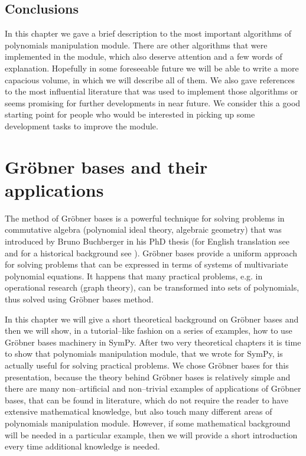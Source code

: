 \subsection{Conclusions}

In this chapter we gave a brief description to the most important algorithms of polynomials
manipulation module. There are other algorithms that were implemented in the module, which
also deserve attention and a few words of explanation. Hopefully in some foreseeable future
we will be able to write a more capacious volume, in which we will describe all of them. We
also gave references to the most influential literature that was used to implement those
algorithms or seems promising for further developments in near future. We consider this a
good starting point for people who would be interested in picking up some development tasks
to improve the module.

\hypertarget{--doc-src/groebner}{}

\section{Gröbner bases and their applications}\label{thesis-groebner}

The method of Gröbner bases is a powerful technique for solving problems in commutative
algebra (polynomial ideal theory, algebraic geometry) that was introduced by Bruno Buchberger
in his PhD thesis \cite{Buchberder1965thesis} (for English translation see \cite{Abramson2006translation}
and for a historical background see \cite{Abramson2009history}). Gröbner bases provide a uniform
approach for solving problems that can be expressed in terms of systems of multivariate polynomial
equations. It happens that many practical problems, e.g.  in operational research (graph theory),
can be transformed into sets of polynomials, thus solved using Gröbner bases method.

In this chapter we will give a short theoretical background on Gröbner bases and then we will
show, in a tutorial--like fashion on a series of examples, how to use Gröbner bases machinery
in SymPy. After two very theoretical chapters it is time to show that polynomials manipulation
module, that we wrote for SymPy, is actually useful for solving practical problems. We chose
Gröbner bases for this presentation, because the theory behind Gröbner bases is relatively
simple and there are many non--artificial and non--trivial examples of applications of Gröbner
bases, that can be found in literature, which do not require the reader to have extensive mathematical
knowledge, but also touch many different areas of polynomials manipulation module. However, if some
mathematical background will be needed in a particular example, then we will provide a short introduction
every time additional knowledge is needed.


